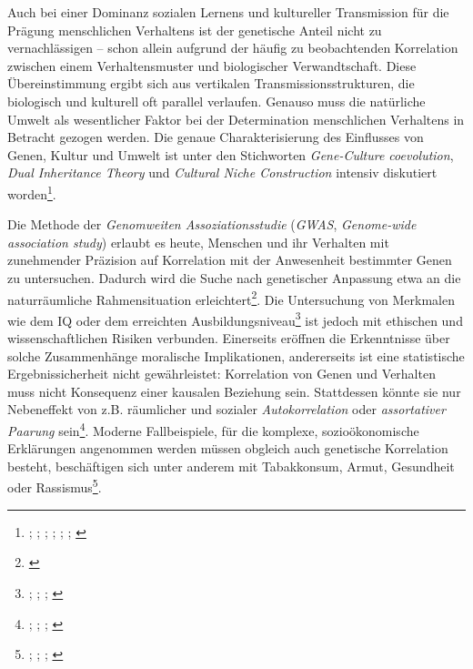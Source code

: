 \documentclass[openany,twoside,twocolumn]{book}
\let\rmarkdownfootnote\footnote%
\def\footnote{\protect\rmarkdownfootnote}
\begin{document}
Auch bei einer Dominanz sozialen Lernens und kultureller Transmission für die Prägung menschlichen Verhaltens ist der genetische Anteil nicht zu vernachlässigen -- schon allein aufgrund der häufig zu beobachtenden Korrelation zwischen einem Verhaltensmuster und biologischer Verwandtschaft. Diese Übereinstimmung ergibt sich aus vertikalen Transmissionsstrukturen, die biologisch und kulturell oft parallel verlaufen. Genauso muss die natürliche Umwelt als wesentlicher Faktor bei der Determination menschlichen Verhaltens in Betracht gezogen werden. Die genaue Charakterisierung des Einflusses von Genen, Kultur und Umwelt ist unter den Stichworten \emph{Gene-Culture coevolution}, \emph{Dual Inheritance Theory} und \emph{Cultural Niche Construction} intensiv diskutiert worden\footnote{\textcite{aoki_gene-culture_2017}; \textcite{boyd_culture_1985}; \textcite{cavalli-sforza_cultural_1981}; \textcite{chudek_culturegene_2011}; \textcite{feldman_aspects_1979}; \textcite{mesoudi_towards_2006}; \textcite{richerson_dual_1978}}.

Die Methode der \emph{Genomweiten Assoziationsstudie} (\emph{GWAS}, \emph{Genome-wide association study}) erlaubt es heute, Menschen und ihr Verhalten mit zunehmender Präzision auf Korrelation mit der Anwesenheit bestimmter Genen zu untersuchen. Dadurch wird die Suche nach genetischer Anpassung etwa an die naturräumliche Rahmensituation erleichtert\footnote{\textcite{berg_population_2014}}. Die Untersuchung von Merkmalen wie dem IQ oder dem erreichten Ausbildungsniveau\footnote{\textcite{benyamin_childhood_2014}; \textcite{davies_genome-wide_2011}; \textcite{minkov_genetic_2015}; \textcite{okbay_genome-wide_2016}} ist jedoch mit ethischen und wissenschaftlichen Risiken verbunden. Einerseits eröffnen die Erkenntnisse über solche Zusammenhänge moralische Implikationen, andererseits ist eine statistische Ergebnissicherheit nicht gewährleistet: Korrelation von Genen und Verhalten muss nicht Konsequenz einer kausalen Beziehung sein. Stattdessen könnte sie nur Nebeneffekt von z.B. räumlicher und sozialer \emph{Autokorrelation} oder \emph{assortativer Paarung} sein\footnote{\textcite{abdellaoui_educational_2015}; \textcite{domingue_genetic_2014}; \textcite{okbay_genome-wide_2016}; \textcite{piffer_review_2015}}. Moderne Fallbeispiele, für die komplexe, sozioökonomische Erklärungen angenommen werden müssen obgleich auch genetische Korrelation besteht, beschäftigen sich unter anderem mit Tabakkonsum, Armut, Gesundheit oder Rassismus\footnote{\textcite{maes_genetic_2006}; \textcite{marden_african_2016}; \textcite{nugent_geneenvironment_2011}; \textcite{paradies_racism_2015}}.
\end{document}
